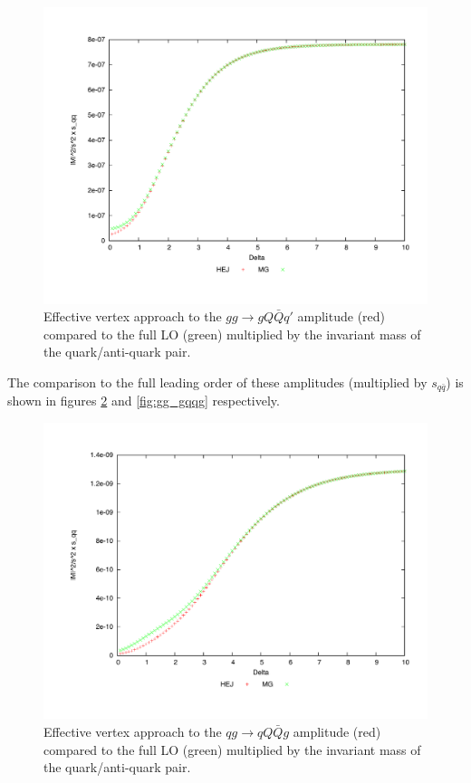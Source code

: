 \begin{figure}[t]
\centering
\includegraphics[scale=0.45]{Images/gg_gQQx_sqqx_simplecf.pdf}
\caption{Effective vertex approach to the $gg \to gQ\bar{Q}q'$ amplitude (red) compared to the full LO (green) multiplied by the invariant mass of the quark/anti-quark pair.}
\label{fig:gg_qqq}
\end{figure}

The comparison to the full leading order of these amplitudes (multiplied by $s_{q\bar{q}}$) is shown in figures \ref{fig:qg_qqqg} and \ref{fig:gg_gqqg} respectively. 

\begin{figure}[H]
\centering
\includegraphics[scale=0.47]{Images/qg_qqqxg_sqq_simplecf.pdf}
\caption{Effective vertex approach to the $qg \to qQ\bar{Q}g$ amplitude (red) compared to the full LO (green) multiplied by the invariant mass of the quark/anti-quark pair.}
\label{fig:qg_qqqg}
\end{figure}

